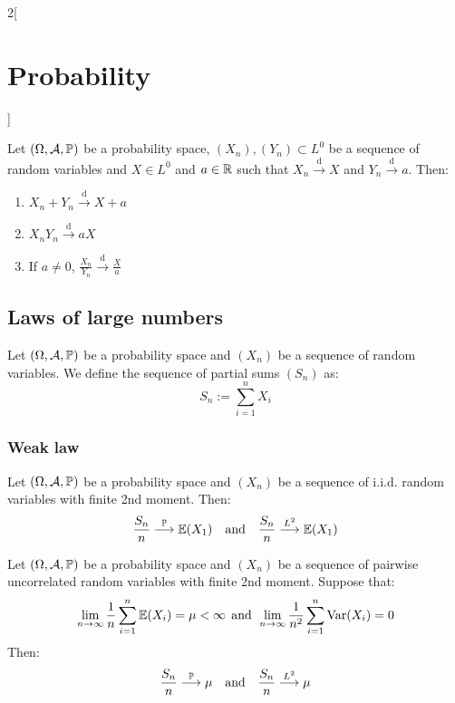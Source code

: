 \documentclass[../../../main.tex]{subfiles}
\begin{document}
\begin{multicols}{2}[\section{Probability}]
\begin{theorem}
        Let $(\Omega,\mathcal{A},\mathbb{P})$ be a probability space, $(X_n),(Y_n)\subset L^0$ be a sequence of random variables and $X\in L^0$ and $a\in\mathbb{R}$ such that $X_n\overset{\text{d}}{\longrightarrow} X$ and $Y_n\overset{\text{d}}{\longrightarrow} a$. Then:
        \begin{enumerate}
            \item $X_n+Y_n\overset{\text{d}}{\longrightarrow} X+ a$
            \item $X_nY_n\overset{\text{d}}{\longrightarrow} aX$
            \item If $a\ne 0$, $\frac{X_n}{Y_n}\overset{\text{d}}{\longrightarrow} \frac{X}{a}$
        \end{enumerate}
    \end{theorem}
    \subsection{Laws of large numbers}
    \begin{definition}
        Let $(\Omega,\mathcal{A},\mathbb{P})$ be a probability space and $(X_n)$ be a sequence of random variables. We define the sequence of partial sums $(S_n)$ as: $$S_n:=\sum_{i=1}^nX_i$$
    \end{definition}
    \subsubsection{Weak law}
    \begin{theorem}
        Let $(\Omega,\mathcal{A},\mathbb{P})$ be a probability space and $(X_n)$ be a sequence of i.i.d. random variables with finite 2nd moment. Then: $$\frac{S_n}{n}\overset{\mathbb{P}}{\longrightarrow}\mathbb{E}(X_1)\quad\text{and}\quad\frac{S_n}{n}\overset{L^2}{\longrightarrow}\mathbb{E}(X_1)$$
    \end{theorem}
    \begin{theorem}
        Let $(\Omega,\mathcal{A},\mathbb{P})$ be a probability space and $(X_n)$ be a sequence of pairwise uncorrelated random variables with finite 2nd moment. Suppose that: $$\lim_{n\to\infty}\frac{1}{n}\sum_{i=1}^n\mathbb{E}(X_i)=\mu<\infty\;\,\text{and}\;\,\lim_{n\to\infty}\frac{1}{n^2}\sum_{i=1}^n\operatorname{Var}(X_i)=0$$ Then: $$\frac{S_n}{n}\overset{\mathbb{P}}{\longrightarrow}\mu\quad\text{and}\quad\frac{S_n}{n}\overset{L^2}{\longrightarrow}\mu$$
    \end{theorem}

\end{multicols}
\end{document}
